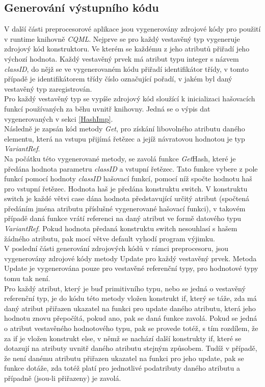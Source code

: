 \documentclass[11pt,twoside,a4paper]{book}
\begin{document}
\subsection{Generování výstupního kódu}
V další části preprocesorové aplikace jsou vygenerovány zdrojové kódy pro použití v runtime knihovně \textit{CQML}.
Nejprve se pro každý vestavěný typ vygeneruje zdrojový kód konstruktoru. Ve kterém se každému z jeho atributů přiřadí jeho výchozí hodnota. Každý vestavěný prvek má atribut typu integer s názvem \textit{classID}, do nějž se ve vygenerovaném kódu přiřadí identifikátor třídy, v tomto případě je identifikátorem třídy číslo označující pořadí, v jakém byl daný vestavěný typ zaregistrován.\\
Pro každý vestavěný typ se vypíše zdrojový kód sloužící k inicializaci hašovacích funkcí používaných za běhu uvnitř knihovny. Jedná se o výpis dat vygenerovaných v sekci \ref{HashImp}.\\
Následně je zapsán kód metody \textit{Get}, pro získání libovolného atributu daného elementu, která na vstupu přijímá řetězec a jejíž návratovou hodnotou je typ \textit{VariantRef}.\\
Na počátku této vygenerované metody, se zavolá funkce \textit{Get}Hash, které je předána hodnota parametru \textit{classID} a vstupní řetězec. Tato funkce vybere z pole funkcí pomocí hodnoty \textit{classID} hašovací funkcí, pomocí níž spočte hodnotu haš pro vstupní řetězec. Hodnota haš je předána konstruktu switch. V konstruktu switch je každé větvi case dána hodnota představující určitý atribut (spočtená předáním jména atributu příslušné vygenerované hašovací funkci), v takovém případě daná funkce vrátí referenci na daný atribut ve formě datového typu \textit{VariantRef}. Pokud hodnota předaná konstruktu switch nesouhlasí s hašem žádného atributu, pak mocí větve default vyhodí program výjimku.\\
V poslední části generování zdrojových kódů v rámci preprocesoru, jsou vygenerovány zdrojové kódy metody Update pro každý vestavěný prvek. Metoda Update je vygenerována pouze pro vestavěné referenční typy, pro hodnotové typy tomu tak není. \\
Pro každý atribut, který je buď primitivního typu, nebo se jedná o vestavěný referenční typ, je do kódu této metody vložen konstrukt if, který se táže, zda má daný atribut přiřazen ukazatel na funkci pro update daného atributu, která jeho hodnotu znovu přepočítá, pokud ano, pak se daná funkce zavolá.
Pokud se jedná o atribut vestavěného hodnotového typu, pak se provede totéž, s tím rozdílem, že za if je vložen konstrukt else, v němž se nachází další konstrukty if, které se dotazují na atributy uvnitř daného atributu stejným způsobem. Tudíž v případě, že není danému atributu přiřazen ukazatel na funkci pro jeho update, pak se funkce dotáže, zda totéž platí pro jednotlivé podatributy daného atributu a případně (jsou-li přiřazeny) je zavolá.\\
\end{document}
